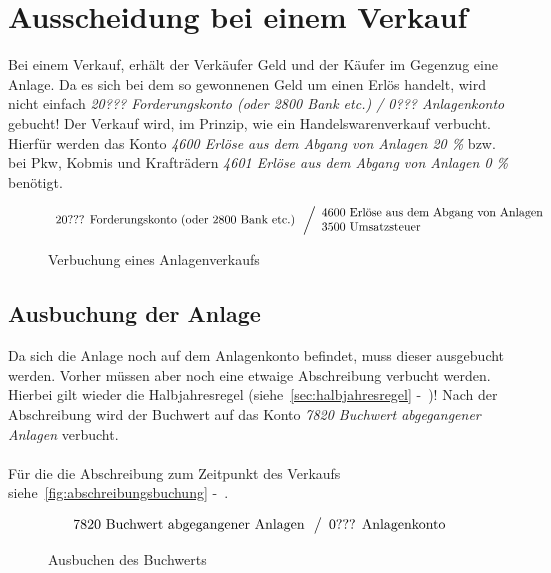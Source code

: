 \documentclass[a4paper,10pt]{report}
\begin{document}
\section{Ausscheidung bei einem Verkauf}
\label{sec:verkaufsausscheidung}
Bei einem Verkauf, erhält der Verkäufer Geld und der Käufer im
Gegenzug eine Anlage. Da es sich bei dem so gewonnenen Geld um einen
Erlös handelt, wird nicht einfach \textit{20??? Forderungskonto (oder
2800 Bank etc.) / 0??? Anlagenkonto} gebucht! Der Verkauf wird, im
Prinzip, wie ein Handelswarenverkauf verbucht. Hierfür werden das
Konto \textit{4600 Erlöse aus dem Abgang von Anlagen 20 \%} bzw. bei
Pkw, Kobmis und Krafträdern \textit{4601 Erlöse aus dem Abgang von
Anlagen 0 \%} benötigt.

\begin{figure}[h]
  \centering
  \begin{equation*}
    \begin{array}{l}
      \text{20??? Forderungskonto (oder 2800 Bank etc.)}\\
    \end{array}
    \left\slash
      \begin{array}{l}
        \text{4600 Erlöse aus dem Abgang von Anlagen}\\
        \text{3500 Umsatzsteuer}\\
      \end{array}
    \right.
  \end{equation*}
  \caption{Verbuchung eines Anlagenverkaufs}
\end{figure}

\subsection{Ausbuchung der Anlage}
\label{subsec:anlagsausbuchung)}
Da sich die Anlage noch auf dem Anlagenkonto befindet, muss dieser
ausgebucht werden. Vorher müssen aber noch eine etwaige Abschreibung
verbucht werden. Hierbei gilt wieder die Halbjahresregel
(siehe~\autoref{sec:halbjahresregel} -~)!
Nach der Abschreibung wird der Buchwert auf das Konto \textit{7820
Buchwert abgegangener Anlagen} verbucht.\\
\\
Für die die Abschreibung zum Zeitpunkt des Verkaufs
siehe~\autoref{fig:abschreibungsbuchung}
-~.

\begin{figure}[h]
  \centering
  \begin{equation*}
    \begin{array}{l}
      \text{7820 Buchwert abgegangener Anlagen}\\
    \end{array}
    \left\slash
      \begin{array}{l}
        \text{0??? Anlagenkonto}\\
      \end{array}
    \right.
  \end{equation*}
  \caption{Ausbuchen des Buchwerts}
  \label{fig:buchwertsausbuchung}
\end{figure}
\end{document}
